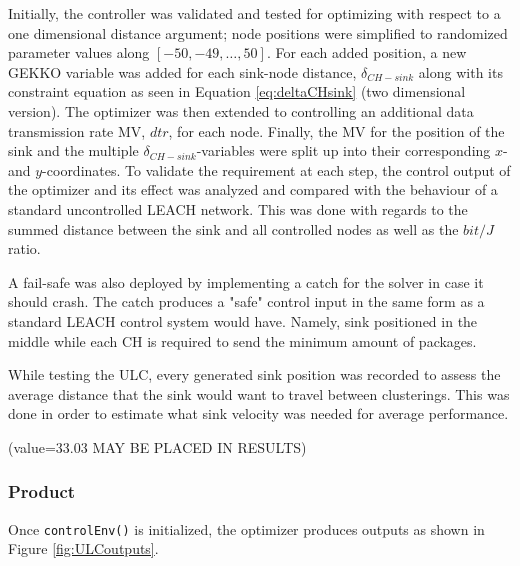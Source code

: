 \noindent Initially, the controller was validated and tested for optimizing with respect to a one dimensional distance argument; node positions were simplified to randomized parameter values along $[-50,-49,\hdots,50]$. For each added position, a new GEKKO variable was added for each sink-node distance, $\delta_{CH-sink}$ along with its constraint equation as seen in Equation \ref{eq:deltaCHsink} (two dimensional version). The optimizer was then extended to controlling an additional data transmission rate MV, $dtr$, for each node. Finally, the MV for the position of the sink and the multiple $\delta_{CH-sink}$-variables were split up into their corresponding $x$- and $y$-coordinates. To validate the requirement at each step, the control output of the optimizer and its effect was analyzed and compared with the behaviour of a standard uncontrolled LEACH network. This was done with regards to the summed distance between the sink and all controlled nodes as well as the $bit/J$ ratio.  \newline
 
\noindent A fail-safe was also deployed by implementing a catch for the solver in case it should crash. The catch produces a "safe" control input in the same form as a standard LEACH control system would have. Namely, sink positioned in the middle while each CH is required to send the minimum amount of packages.\newline

\noindent While testing the ULC, every generated sink position was recorded to assess the average distance that the sink would want to travel between clusterings. This was done in order to estimate what sink velocity was needed for average performance. 

(value=33.03 MAY BE PLACED IN RESULTS)

\subsubsection{Product}
Once \verb!controlEnv()! is initialized, the optimizer produces outputs as shown in Figure \ref{fig:ULCoutputs}.

